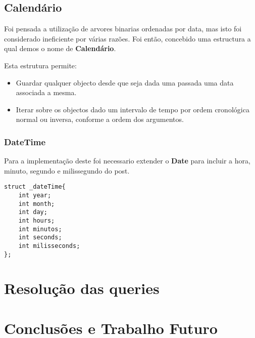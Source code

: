 \documentclass[10pt,a4paper]{report}
\begin{document}
    \section{Calendário}
        Foi pensada a utilização de arvores binarias ordenadas por data,
        mas isto foi considerado ineficiente por várias razões. Foi então,
        concebido uma estructura a qual demos o nome de \textbf{Calendário}.

        Esta estrutura permite:
        \begin{itemize}
                \item Guardar qualquer objecto desde que seja dada
                      uma passada uma data associada a mesma.
                \item Iterar sobre os objectos dado um intervalo de tempo
                      por ordem cronológica normal ou inversa, conforme a
                      ordem dos argumentos.
        \end{itemize}
        \subsection{DateTime}
        Para a implementação deste foi necessario extender o \textbf{Date} para
        incluir a hora, minuto, segundo e milissegundo do post.
    \begin{verbatim}
struct _dateTime{
    int year;
    int month;
    int day;
    int hours;
    int minutos;
    int seconds;
    int milisseconds;
};
    \end{verbatim}

\chapter{Resolução das queries}

\chapter{Conclusões e Trabalho Futuro}
\end{document}
